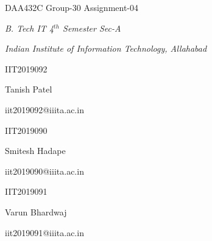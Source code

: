 \documentclass[12pt,a4paper]{article}
\begin{document}
\begin{center}DAA432C Group-30 Assignment-04\end{center}

\begin{center}\textit{B. Tech IT 4$^{th}$ Semester Sec-A}
\end{center}

\begin{center}\textit{Indian Institute of Information Technology, 
Allahabad}\end{center}


\begin{multicols}{3}
\begin{center}IIT2019092\end{center}

\begin{center}Tanish Patel\end{center}

\begin{center}iit2019092@iiita.ac.in\end{center}

\begin{center}IIT2019090\end{center}

\begin{center}Smitesh Hadape\end{center}

\begin{center}iit2019090@iiita.ac.in\end{center}

\begin{center}IIT2019091\end{center}

\begin{center}Varun Bhardwaj\end{center}

\begin{center}iit2019091@iiita.ac.in\end{center}
\end{multicols}
\end{document}
